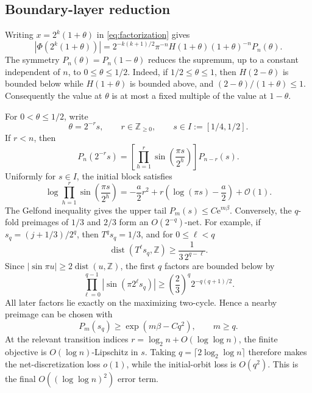 \documentclass[11pt]{article}
\theoremstyle{definition}
\theoremstyle{remark}
\newcommand{\Z}{\mathbb Z}
\newcommand{\e}{\mathrm e}
\newcommand{\bigO}{\mathcal O}
\newcommand{\T}{T}
\begin{document}
\subsection{Boundary-layer reduction}

Writing \(x=2^k(1+\theta)\) in \eqref{eq:factorization} gives
\begin{equation}
 |\Phi(2^k(1+\theta))|
 =2^{-k(k+1)/2}\pi^{-n}
 H(1+\theta)(1+\theta)^{-n}P_n(\theta).
 \label{eq:annulus-exact}
\end{equation}
The symmetry \(P_n(\theta)=P_n(1-\theta)\) reduces the supremum, up to a
constant independent of \(n\), to \(0\le\theta\le1/2\).  Indeed, if
\(1/2\le\theta\le1\), then \(H(2-\theta)\) is bounded below while
\(H(1+\theta)\) is bounded above, and
\((2-\theta)/(1+\theta)\le1\).  Consequently the value at \(\theta\) is at
most a fixed multiple of the value at \(1-\theta\).

For \(0<\theta\le1/2\), write
\begin{equation}
 \theta=2^{-r}s,
 \qquad r\in\Z_{\ge0},
 \qquad s\in I:=[1/4,1/2].
 \label{eq:transition}
\end{equation}
If \(r<n\), then
\begin{equation}
 P_n(2^{-r}s)
 =\left[\prod_{h=1}^{r}\sin\!\left(\frac{\pi s}{2^h}\right)\right]
 P_{n-r}(s).
 \label{eq:transition-product}
\end{equation}
Uniformly for \(s\in I\), the initial block satisfies
\begin{equation}
 \log\prod_{h=1}^{r}\sin\!\left(\frac{\pi s}{2^h}\right)
 =-\frac a2r^2+r\left(\log(\pi s)-\frac a2\right)+\bigO(1).
 \label{eq:small-block}
\end{equation}
The Gelfond inequality gives the upper tail
\(P_m(s)\le C\e^{m\beta}\).  Conversely, the \(q\)-fold preimages of
\(1/3\) and \(2/3\) form an \(O(2^{-q})\)-net.  For example, if
\(s_q=(j+1/3)/2^q\), then \(\T^qs_q=1/3\), and for \(0\le \ell<q\)
\[
 \operatorname{dist}(\T^\ell s_q,\Z)
 \ge \frac1{3\,2^{q-\ell}}.
\]
Since \(|\sin\pi u|\ge2\operatorname{dist}(u,\Z)\), the first \(q\)
factors are bounded below by
\[
 \prod_{\ell=0}^{q-1}|\sin(\pi2^\ell s_q)|
 \ge \left(\frac23\right)^q2^{-q(q+1)/2}.
\]
All later factors lie exactly on the maximizing two-cycle.  Hence a nearby
preimage can be chosen with
\begin{equation}
 P_m(s_q)\ge\exp(m\beta-Cq^2),
 \qquad m\ge q.
 \label{eq:dense-preimages}
\end{equation}
At the relevant transition indices \(r=\log_2 n+O(\log\log n)\), the finite
objective is \(O(\log n)\)-Lipschitz in \(s\).  Taking
\(q=\lceil2\log_2\log n\rceil\) therefore makes the net-discretization loss
\(o(1)\), while the initial-orbit loss is \(O(q^2)\).  This is the final
\(O((\log\log n)^2)\) error term.
\end{document}
